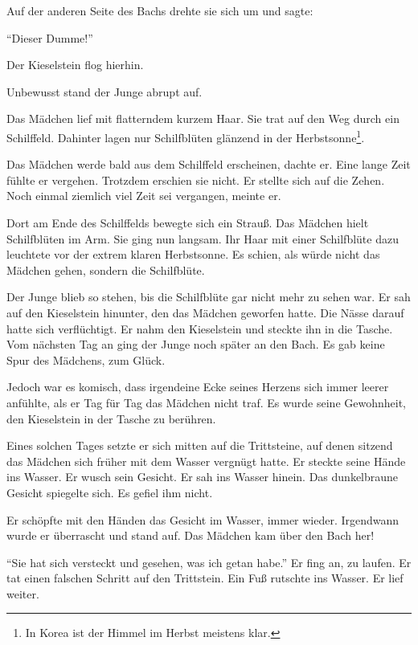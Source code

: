 \documentclass[prd,12pt,tightenlines,notitlepage,nofootinbib]{revtex4-1}
\begin{document}
Auf der anderen Seite des Bachs drehte sie sich um und
sagte:

"`Dieser Dumme!"'

Der Kieselstein flog hierhin.

Unbewusst stand der Junge abrupt auf.

Das Mädchen lief mit flatterndem kurzem
Haar.  Sie trat auf den Weg durch ein Schilffeld.  Dahinter lagen nur
Schilfblüten glänzend in der Herbstsonne\footnote{In Korea ist
der Himmel im Herbst meistens klar.}.

Das Mädchen werde bald aus dem
Schilffeld erscheinen, dachte er.  Eine lange Zeit fühlte er vergehen.
Trotzdem erschien sie nicht.  Er stellte sich auf die Zehen.  Noch einmal
ziemlich viel Zeit sei vergangen, meinte er.

Dort am Ende des
Schilffelds bewegte sich ein Strauß.  Das Mädchen hielt Schilfblüten
im Arm.  Sie ging nun langsam.  Ihr Haar mit einer Schilfblüte dazu
leuchtete vor der extrem klaren Herbstsonne.  Es schien, als würde
nicht das Mädchen gehen, sondern die Schilfblüte.

Der Junge blieb
so stehen, bis die Schilfblüte gar nicht mehr zu sehen war.  Er sah
auf den Kieselstein hinunter, den das Mädchen geworfen hatte.  Die Nässe darauf
hatte sich verflüchtigt.  Er nahm den Kieselstein und steckte ihn in die
Tasche.
\\

Vom nächsten Tag an ging der Junge noch später an den Bach.  Es gab
keine Spur %
des Mädchens, zum Glück.

Jedoch war es komisch, dass
irgendeine Ecke seines Herzens sich immer leerer anfühlte, als er Tag für
Tag das Mädchen nicht traf.  Es wurde seine Gewohnheit, den
Kieselstein in der Tasche zu berühren.

Eines solchen Tages setzte er
sich mitten auf die Trittsteine, auf denen sitzend das Mädchen sich früher mit
dem Wasser vergnügt hatte.  Er steckte seine Hände ins Wasser.
Er wusch sein Gesicht.  Er sah ins Wasser hinein.  Das dunkelbraune
Gesicht spiegelte sich.  Es gefiel ihm nicht.

Er schöpfte mit den
Händen das Gesicht im Wasser, immer wieder.  Irgendwann wurde er
überrascht und stand auf.  Das Mädchen kam über den Bach her!

"`Sie hat sich versteckt und gesehen, was ich getan habe."'
Er fing an,
zu laufen.  Er tat einen falschen Schritt auf den Trittstein.  Ein
Fuß rutschte ins Wasser.  Er lief weiter.
\end{document}

